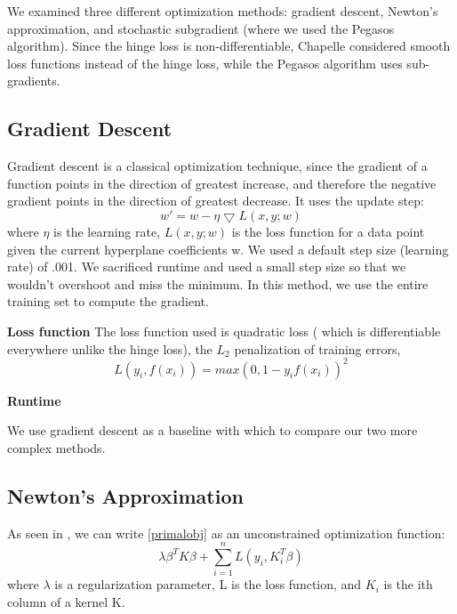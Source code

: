 \documentclass[letterpaper, 11pt]{article}
\begin{document}
We examined three different optimization methods: gradient descent, Newton's approximation, and stochastic subgradient (where we used the Pegasos algorithm).  Since the hinge loss is non-differentiable, Chapelle considered smooth loss functions instead of the hinge loss\cite{chapelle2007training}, while the Pegasos algorithm\cite{pegasos} uses sub-gradients.

\subsection{Gradient Descent}

Gradient descent is a classical optimization technique, since the gradient of a function points in the direction of greatest increase, and therefore the negative gradient points in the direction of greatest decrease.  It uses the update step:
\begin{equation}
	w' = w - \eta\bigtriangledown L(x,y; w)
\end{equation} 
where $\eta$ is the learning rate, $L(x,y; w)$ is the loss function for a data point given the current hyperplane coefficients w.  We used a default step size (learning rate) of .001.  We sacrificed runtime and  used a small step size so that we wouldn't overshoot and miss the minimum.  In this method, we use the entire training set to compute the gradient.\cite{menon}

\textbf{Loss function} The loss function used is quadratic loss ( which is differentiable everywhere unlike the hinge loss), the $L_2$ penalization of training errors, $$ L(y_i, f(x_i)) = max (0, 1-y_if(x_i))^2 $$

\textbf{Runtime}

We use gradient descent as a baseline with which to compare our two more complex methods.

\subsection{Newton's Approximation}

As seen in \citeauthor{chapelle2007training}, we can write \eqref{primalobj} as an unconstrained optimization function:
\begin{equation}
	\lambda \beta^TK\beta + \sum_{i=1}^n L(y_i, K_i^T\beta)
	\label{newton}
\end{equation}
 where $\lambda$ is a regularization parameter, L is the loss function, and $K_i$ is the ith column of a kernel K.
\end{document}
